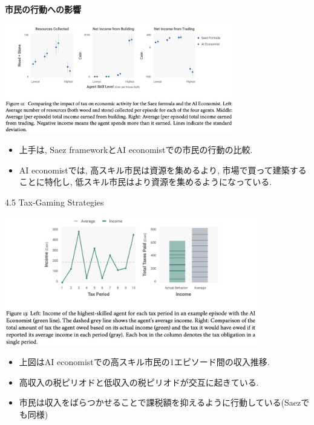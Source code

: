 \documentclass[unicode,aspectratio=169,11pt]{beamer}
\begin{document}
\begin{frame}{}{}
{\bf 市民の行動への影響}
\begin{center}
    \includegraphics[width=10cm]{figure12.png}
\end{center}
\begin{itemize}
    \item 上手は, Saez frameworkとAI economistでの市民の行動の比較.
    \item AI economistでは, 高スキル市民は資源を集めるより, 市場で買って建築することに特化し, 低スキル市民はより資源を集めるようになっている.
\end{itemize}
\end{frame}

\begin{frame}{4.5 Tax-Gaming Strategies}{}
    \begin{center}
        \includegraphics[width=11cm]{figure13.png}
    \end{center}
    {\footnotesize\begin{itemize}
        \item 上図はAI economistでの高スキル市民の1エピソード間の収入推移.
        \item 高収入の税ピリオドと低収入の税ピリオドが交互に起きている.
        \item 市民は収入をばらつかせることで課税額を抑えるように行動している(Saezでも同様)
    \end{itemize}}
\end{frame}
\end{document}
